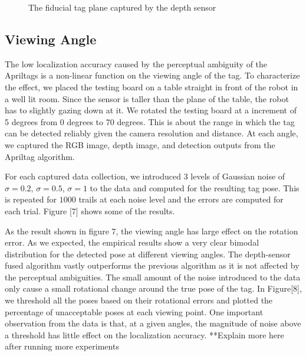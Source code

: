 \begin{figure}
\caption{The fiducial tag plane captured by the depth sensor}
\label{fig:calib}
\end{figure}

\subsection{Viewing Angle}
The low localization accuracy caused by the perceptual ambiguity of the Apriltags is a non-linear function on the viewing angle of the tag. To characterize the effect, we placed the testing board on a table straight in front of the robot in a well lit room. Since the sensor is taller than the plane of the table, the robot has to slightly gazing down at it.  We rotated the testing board at a increment of 5 degrees from 0 degrees to 70 degrees. This is about the range in which the tag can be detected reliably given the camera resolution and distance. At each angle, we captured the RGB image, depth image, and detection outputs from the Apriltag algorithm. 

For each captured data collection, we introduced 3 levels of Gaussian noise of $\sigma = 0.2$, $\sigma = 0.5$, $\sigma = 1$  to the data and computed for the resulting tag pose. This is repeated for $1000$ trails at each noise level and the errors are computed for each trial. Figure [7] shows some of the results. 

As the result shown in figure 7, the viewing angle has large effect on the rotation error. As we expected, the empirical results show a very clear bimodal distribution for the detected pose at different viewing angles. The depth-sensor fused algorithm vastly outperforms the previous algorithm as it is not affected by the perceptual ambiguities. The small amount of the noise introduced to the data only cause a small rotational change around the true pose of the tag. In Figure[8], we threshold all the poses based on their rotational errors and plotted the percentage of unacceptable poses at each viewing point. One important observation from the data is that, at a given angles, the magnitude of noise above a threshold has little effect on the localization accuracy. **Explain more here after running more experiments
